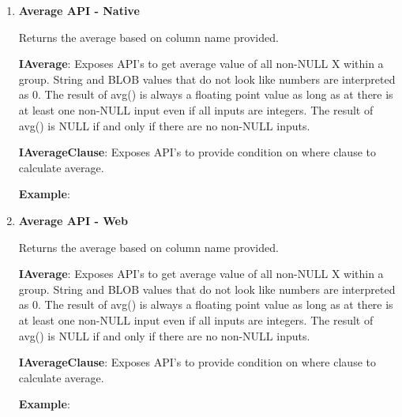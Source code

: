 		\begin{enumerate}

			\item \small \textbf{Average API - Native}
				\par 
				Returns the average based on column name provided.
					
		
				\textbf{IAverage}:  Exposes API's to get average value of all non-NULL X within a group. 
 						 String and BLOB values that do not look like numbers are interpreted as 0.
						 The result of avg() is always a floating point value as long as at there is at least one non-NULL input even if all inputs are integers.
						 The result of avg() is NULL if and only if there are no non-NULL inputs.

					

			
				\textbf{IAverageClause}: Exposes API's to provide condition on where clause to calculate average.
					

				\textbf{Example}: 
					


			\item \small \textbf{Average API - Web}	
				\par 
				Returns the average based on column name provided.
					
		
				\textbf{IAverage}:  Exposes API's to get average value of all non-NULL X within a group. 
 						 String and BLOB values that do not look like numbers are interpreted as 0.
						 The result of avg() is always a floating point value as long as at there is at least one non-NULL input even if all inputs are integers.
						 The result of avg() is NULL if and only if there are no non-NULL inputs.

					

			
				\textbf{IAverageClause}: Exposes API's to provide condition on where clause to calculate average.
					

				\textbf{Example}: 
					

		\end{enumerate}

